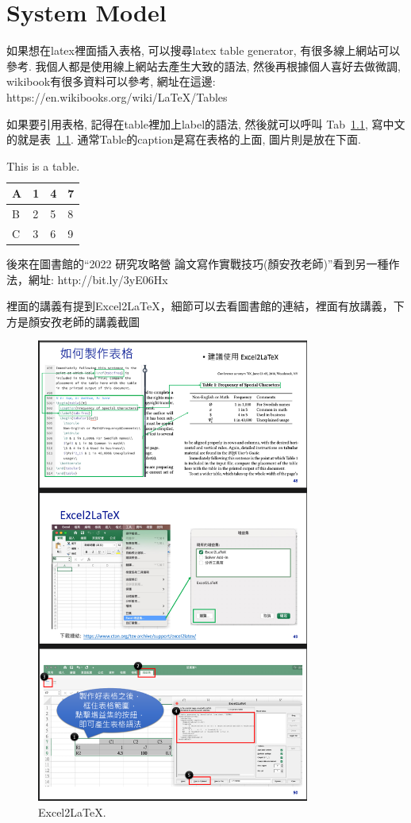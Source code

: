\chapter{System Model}
\label{ch:architecture}

如果想在latex裡面插入表格, 可以搜尋latex table generator, 有很多線上網站可以參考. 我個人都是使用線上網站去產生大致的語法, 然後再根據個人喜好去做微調, wikibook有很多資料可以參考, 網址在這邊: https://en.wikibooks.org/wiki/LaTeX/Tables

如果要引用表格, 記得在table裡加上label的語法, 然後就可以呼叫 Tab~\ref{tab1}, 寫中文的就是表~\ref{tab1}. 通常Table的caption是寫在表格的上面, 圖片則是放在下面.

\begin{table}[!ht]
    \centering
    \caption{This is a table.}
    \label{tab1}
    \begin{tabular}{|l|l|l|l|}
    \hline
        A & 1 & 4 & 7 \\ \hline
        B & 2 & 5 & 8 \\ \hline
        C & 3 & 6 & 9 \\ \hline
    \end{tabular}
\end{table}

後來在圖書館的``2022 研究攻略營 論文寫作實戰技巧(顏安孜老師)''看到另一種作法，網址: http://bit.ly/3yE06Hx

裡面的講義有提到Excel2LaTeX，細節可以去看圖書館的連結，裡面有放講義，下方是顏安孜老師的講義截圖

\begin{figure}[htb]
	\centering
	\includegraphics[width=0.8\textwidth]{img/excel2latex.png}
	\caption{Excel2LaTeX.}
	\label{fig:excel2latex}
\end{figure}

